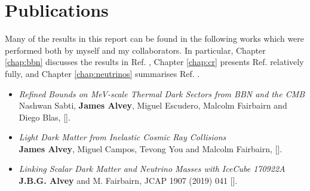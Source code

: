 {
\onehalfspacing
\chapter*{Publications}
Many of the results in this report can be found in the following works which were performed both by myself and my collaborators. In particular, Chapter \ref{chap:bbn} discusses the results in Ref. \cite{Sabti:2019mhn}, Chapter \ref{chap:cr} presents Ref. \cite{Alvey:2019zaa} relatively fully, and Chapter \ref{chap:neutrinos} summarises Ref. \cite{Alvey:2019jzx}.

\begin{itemize}
	\item[\cite{Sabti:2019mhn}] \emph{Refined Bounds on MeV-scale Thermal Dark Sectors from BBN and the CMB} \vspace{0.1cm} \\ Nashwan Sabti, \textbf{James Alvey}, Miguel Escudero, Malcolm Fairbairn and Diego Blas, [].
	\item[\cite{Alvey:2019zaa}] \emph{Light Dark Matter from Inelastic Cosmic Ray Collisions} \vspace{0.1cm} \\ \textbf{James Alvey}, Miguel Campos, Tevong You and Malcolm Fairbairn, [].
	\item[\cite{Alvey:2019jzx}] \emph{Linking Scalar Dark Matter and Neutrino Masses with IceCube 170922A} \vspace{0.1cm} \\ \textbf{J.B.G. Alvey} and M. Fairbairn, JCAP 1907 (2019) 041 [].
\end{itemize}
}